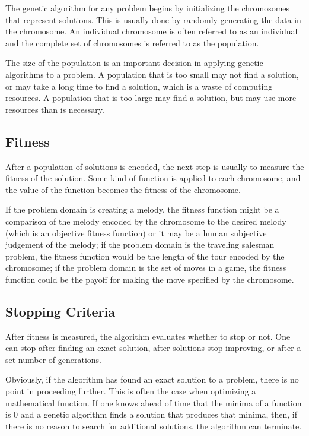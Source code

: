 The genetic algorithm for any problem begins by initializing the chromosomes
that represent solutions. This is usually done by randomly generating the data
in the chromosome. An individual chromosome is often referred to as an
individual and the complete set of chromosomes is referred to as the population.

The size of the population is an important decision in applying genetic
algorithms to a problem. A population that is too small may not find a solution,
or may take a long time to find a solution, which is a waste of computing
resources. A population that is too large may find a solution, but may use more
resources than is necessary.

\subsection{Fitness}

After a population of solutions is encoded, the next step is usually to measure
the fitness of the solution. Some kind of function is applied to each
chromosome, and the value of the function becomes the fitness of the chromosome.

If the problem domain is creating a melody, the fitness function might be a
comparison of the melody encoded by the chromosome to the desired melody (which
is an objective fitness function) or it may be a human subjective judgement of
the melody; if the problem domain is the traveling salesman problem, the fitness
function would be the length of the tour encoded by the chromosome; if the
problem domain is the set of moves in a game, the fitness function could be the
payoff for making the move specified by the chromosome.

\subsection{Stopping Criteria}

After fitness is measured, the algorithm evaluates whether to stop or not. One
can stop after finding an exact solution, after solutions stop improving, or
after a set number of generations.

Obviously, if the algorithm has found an exact solution to a problem, there is
no point in proceeding further. This is often the case when optimizing a
mathematical function. If one knows ahead of time that the minima of a function
is 0 and a genetic algorithm finds a solution that produces that minima, then,
if there is no reason to search for additional solutions, the algorithm can
terminate.

